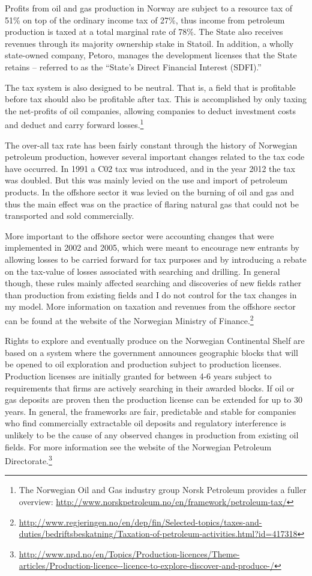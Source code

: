 \documentclass[12pt]{article}
\begin{document}
Profits from oil and gas production in Norway are subject to a resource tax of 51\% on top of the ordinary income tax of 27\%, thus income from petroleum production is taxed at a total marginal rate of 78\%.  The State also receives revenues through its majority ownership stake in Statoil. In addition, a wholly state-owned company, Petoro, manages the development licenses that the State retains -- referred to as the ``State's Direct Financial Interest (SDFI).''

The tax system is also designed to be neutral. That is, a field that is profitable before tax should also be profitable after tax. This is accomplished by only taxing the net-profits of oil companies, allowing companies to deduct investment costs and deduct and carry forward losses.\footnote{The Norwegian Oil and Gas industry group Norsk Petroleum provides a fuller overview: \url{http://www.norskpetroleum.no/en/framework/petroleum-tax/}}

The over-all tax rate has been fairly constant through the history of Norwegian petroleum production, however several important changes related to the tax code have occurred.  In 1991 a C02 tax was introduced, and in the year 2012 the tax was doubled.  But this was mainly levied on the use and import of petroleum products.  In the offshore sector it was levied on the burning of oil and gas and thus the main effect was on the practice of flaring natural gas that could not be transported and sold commercially.

More important to the offshore sector were accounting changes that were implemented in 2002 and 2005, which were meant to encourage new entrants by allowing losses to be carried forward for tax purposes and by introducing a rebate on the tax-value of losses associated with searching and drilling.  In general though, these rules mainly affected searching and discoveries of new fields rather than production from existing fields and I do not control for the tax changes in my model.  More information on taxation and revenues from the offshore sector can be found at the website of the Norwegian Ministry of Finance.\footnote{\url{http://www.regjeringen.no/en/dep/fin/Selected-topics/taxes-and-duties/bedriftsbeskatning/Taxation-of-petroleum-activities.html?id=417318}}

Rights to explore and eventually produce on the Norwegian Continental Shelf are based on a system where the government announces geographic blocks that will be opened to oil exploration and production subject to production licenses.  Production licenses are initially granted for between 4-6 years subject to requirements that firms are actively searching in their awarded blocks.  If oil or gas deposits are proven then the production license can be extended for up to 30 years.  In general, the frameworks are fair, predictable and stable for companies who find commercially extractable oil deposits and regulatory interference is unlikely to be the cause of any observed changes in production from existing oil fields.  For more information see the website of the Norwegian Petroleum Directorate.\footnote{\url{http://www.npd.no/en/Topics/Production-licences/Theme-articles/Production-licence--licence-to-explore-discover-and-produce-/}}
\end{document}

